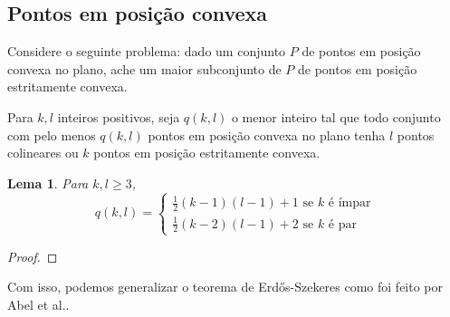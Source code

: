 \documentclass[a4paper]{book}
\newtheorem{lema}{Lema}
\begin{document}
\subsection{Pontos em posição convexa}
Considere o seguinte problema: dado um conjunto $P$ de pontos em posição convexa no plano, ache um maior subconjunto de $P$ de pontos em posição estritamente convexa.

Para $k,l$ inteiros positivos, seja $q(k,l)$ o menor inteiro tal que todo conjunto com pelo menos $q(k,l)$ pontos em posição convexa no plano tenha $l$ pontos colineares ou $k$ pontos em posição estritamente convexa.

\begin{lema}\label{convex}
    Para $k,l\geq 3$, 
    $$q(k,l)=
    \begin{cases}
        \frac{1}{2}(k-1)(l-1)+1 \text{ se }k\text{ é ímpar}\\
        \frac{1}{2}(k-2)(l-1)+2  \text{ se }k\text{ é par}
    \end{cases}$$
\end{lema}
\begin{proof}

\end{proof}

Com isso, podemos generalizar o teorema de Erd\H os-Szekeres como foi feito por Abel et al.\cite{pentagon}.
\end{document}
